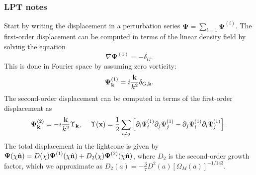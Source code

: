 \documentclass[a4paper,10pt]{article}
\newcommand{\nv}{\hat{\bf n}}
\newcommand{\disp}{\boldsymbol{\Psi}}
\begin{document}
  \subsubsection{LPT notes}
    Start by writing the displacement in a perturbation series
    $\disp=\sum_{i=1}\disp^{(i)}$. The first-order displacement can be computed
    in terms of the linear density field by solving the equation
    \begin{equation}
      \nabla\disp^{(1)}=-\delta_G.
    \end{equation}
    This is done in Fourier space by assuming zero vorticity:
    \begin{equation}
      \disp^{(1)}_{\bf k}=i\frac{{\bf k}}{k^2}\delta_{G,{\bf k}}.
    \end{equation}
    The second-order displacement can be computed in terms of the first-order	displacement as 
    \begin{equation}
      \disp^{(2)}_{\bf k}=-i\frac{{\bf k}}{k^2}\Upsilon_{\bf k},
      \hspace{12pt}
      \Upsilon({\bf x})=\frac{1}{2}\sum_{i\neq j} \left[\partial_i\Psi^{(1)}_i\partial_j\Psi^{(1)}_j - \partial_j\Psi^{(1)}_i\partial_i\Psi^{(1)}_j\right].
    \end{equation}
    The total displacement in the lightcone is given by $\disp(\chi\nv)=D(\chi)\disp^{(1)}(\chi\nv)+D_2(\chi)\disp^{(2)}(\chi\nv)$, where $D_2$ is the second-order growth factor, which we approximate as $D_2(a)=-\frac{3}{7}D^2(a)[\Omega_M(a)]^{-1/143}$.

    
\end{document}
